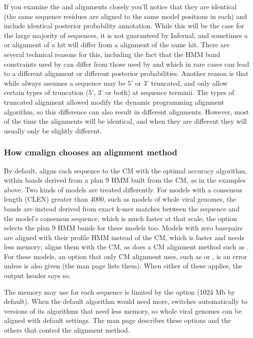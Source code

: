 If you examine the  and  alignments closely
you'll notice that they are identical (the same sequence residues are
aligned to the same model positions in each) and include identical
posterior probability annotation. While this will be the case for the
large majority of sequences, it is not guaranteed by Infernal, and
sometimes a  or  alignment of a hit will
differ from a  alignment of the same hit. There are
several technical reasons for this, including the fact that the HMM
band constraints used by  can differ from those used by
 and  which in rare cases can lead to a
different alignment or different posterior probabilities. Another
reason is that while  always assumes a sequence may be
5' or 3' truncated,  and  only allow
certain types of truncation (5', 3' or both) at sequence
terminii. The types of truncated alignment allowed modify the
dynamic programming alignment algorithm, so this difference can also
result in different alignments. However, most of the time the
alignments will be identical, and when they are different they will
usually only be slightly different.

\subsubsection{How cmalign chooses an alignment method}
By default,  aligns each sequence to the CM with the
optimal accuracy algorithm, within bands derived from a plan 9 HMM
built from the CM, as in the examples above. Two kinds of models are
treated differently. For models with a consensus length (CLEN) greater
than 4000, such as models of whole viral genomes, the bands are instead
derived from exact k-mer matches between the sequence and the model's
consensus sequence, which is much faster at that scale; the
 option selects the plan 9 HMM bands for these models
too. Models with zero basepairs are aligned with their profile HMM
instead of the CM, which is faster and needs less memory;
 aligns them with the CM, as does a CM alignment method
such as . For these models, an option that only CM
alignment uses, such as  or , is an error
unless  is also given (the man page lists them).
When either of these applies, the output header says so.

The memory  may use for each sequence is limited by the
 option (1024 Mb by default). When the default
algorithm would need more,  switches automatically to
versions of its algorithms that need less memory, so whole viral
genomes can be aligned with default settings. The  man
page describes these options and the others that control the
alignment method.

